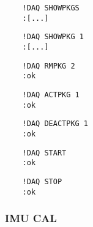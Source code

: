 \begin{verbatim}
	!DAQ SHOWPKGS
	:[...]
\end{verbatim}

\begin{verbatim}
	!DAQ SHOWPKG 1
	:[...]
\end{verbatim}

\begin{verbatim}
	!DAQ RMPKG 2
	:ok
\end{verbatim}


\begin{verbatim}
	!DAQ ACTPKG 1
	:ok
\end{verbatim}

\begin{verbatim}
	!DAQ DEACTPKG 1
	:ok
\end{verbatim}

\begin{verbatim}
	!DAQ START
	:ok
\end{verbatim}

\begin{verbatim}
	!DAQ STOP
	:ok
\end{verbatim}



\subsubsection{IMU CAL}






